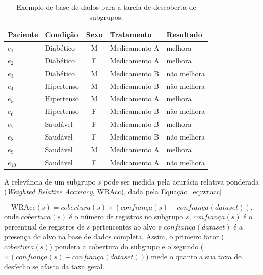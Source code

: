 \begin{table}[H]
\centering
\caption{Exemplo de base de dados para a tarefa de descoberta de subgrupos.}\label{tab:met-exemplo}%
\tabcompacta
\begin{tabular}{@{}lL{2.2cm}cL{2.6cm}L{2.4cm}@{}}
\toprule
Paciente & Condição & Sexo & Tratamento & Resultado\\
\midrule
$e_{1}$ & Diabético & M & Medicamento A & melhora\\
$e_{2}$ & Diabético & F & Medicamento A & melhora\\
$e_{3}$ & Diabético & M & Medicamento B & não melhora\\
$e_{4}$ & Hipertenso & M & Medicamento B & não melhora\\
$e_{5}$ & Hipertenso & M & Medicamento A & melhora\\
$e_{6}$ & Hipertenso & F & Medicamento B & não melhora\\
$e_{7}$ & Saudável & F & Medicamento B & melhora\\
$e_{8}$ & Saudável & F & Medicamento B & não melhora\\
$e_{9}$ & Saudável & M & Medicamento A & melhora\\
$e_{10}$ & Saudável & F & Medicamento A & não melhora\\
\bottomrule
\end{tabular}
\end{table}


A relevância de um subgrupo $s$ pode ser medida pela acurácia relativa ponderada (\emph{Weighted Relative Accuracy}, WRAcc), dada pela Equação~\ref{eq:wracc}

\begin{equation}\label{eq:wracc}
\mathrm{WRAcc}(s) = cobertura(s) \times \left(\textit{confiança}(s) - \textit{confiança}(dataset)\right),
\end{equation}
onde $cobertura(s)$ é o número de registros no subgrupo $s$, $\textit{confiança}(s)$ é o percentual de registros de $s$ pertencentes ao alvo e $\textit{confiança}(dataset)$ é a presença do alvo na base de dados completa.
Assim, o primeiro fator ($cobertura(s)$) pondera a cobertura do subgrupo e o segundo ($\times \left(\textit{confiança}(s) - \textit{confiança}(dataset)\right)$) mede o quanto a sua taxa do desfecho se afasta da taxa geral.


